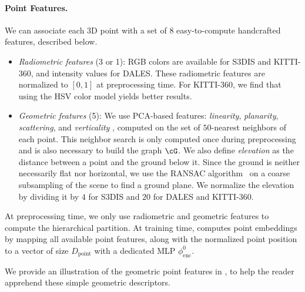 \paragraph{Point Features.} We can associate each 3D point with a set of 
{$8$ easy-to-compute handcrafted features, described below.}

\begin{itemize}
    \item \textit{Radiometric features} (3 or 1): RGB colors are available for S3DIS and KITTI-360, and intensity values for DALES. These radiometric features are normalized to $[0, 1]$ at preprocessing time. 
    For KITTI-360, we find that using the HSV color model yields better results.

    \item \textit{Geometric features} (5): We use PCA-based features: \textit{linearity}, \textit{planarity}, \textit{scattering}, \cite{demantke2011dimensionality} and \textit{verticality} \cite{guinard2017weakly}, computed on the set of $50$-nearest neighbors of each point. This neighbor search is only computed once during preprocessing and is also necessary to build the graph $\cG$.
    We also define \textit{elevation} as the distance between a point and the ground below it. Since the ground is neither necessarily flat nor horizontal, we use the RANSAC algorithm~\cite{fischler1981random} on a coarse subsampling of the scene to find a ground plane. We normalize the elevation by dividing it by $4$ for S3DIS and $20$ for DALES and KITTI-360.

\end{itemize}

At preprocessing time, we only use radiometric and geometric features to compute the hierarchical partition. At training time, \SHORTHAND computes point embeddings by mapping all available point features, along with the normalized point position to a vector of size $D_\text{point}$ with a dedicated MLP $\phi^0_\text{enc}$.

We provide an illustration of the geometric point features in , to help the reader apprehend these simple geometric descriptors. 



